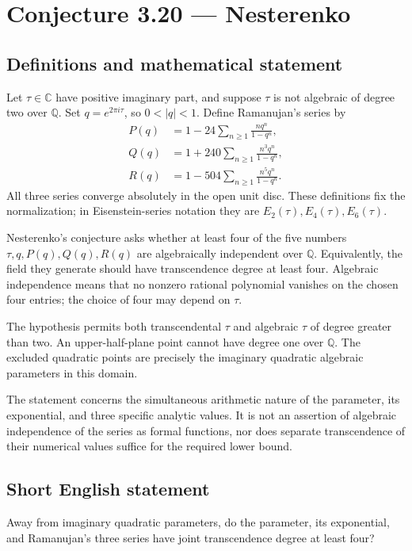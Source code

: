 \documentclass[11pt,a4paper]{article}
\begin{document}
\section*{Conjecture 3.20 — Nesterenko}\label{statement}

\subsection{Definitions and mathematical statement}
Let $\tau\in\mathbb C$ have positive imaginary part, and suppose $\tau$ is not algebraic of degree two over $\mathbb Q$. Set $q=e^{2\pi i\tau}$, so $0<|q|<1$. Define Ramanujan's series by
\[
\begin{aligned}
P(q)&=1-24\sum_{n\ge1}\frac{nq^n}{1-q^n},\\
Q(q)&=1+240\sum_{n\ge1}\frac{n^3q^n}{1-q^n},\\
R(q)&=1-504\sum_{n\ge1}\frac{n^5q^n}{1-q^n}.
\end{aligned}
\]
All three series converge absolutely in the open unit disc. These definitions fix the normalization; in Eisenstein-series notation they are $E_2(\tau),E_4(\tau),E_6(\tau)$.

Nesterenko's conjecture asks whether at least four of the five numbers $\tau,q,P(q),Q(q),R(q)$ are algebraically independent over $\mathbb Q$. Equivalently, the field they generate should have transcendence degree at least four. Algebraic independence means that no nonzero rational polynomial vanishes on the chosen four entries; the choice of four may depend on $\tau$.

The hypothesis permits both transcendental $\tau$ and algebraic $\tau$ of degree greater than two. An upper-half-plane point cannot have degree one over $\mathbb Q$. The excluded quadratic points are precisely the imaginary quadratic algebraic parameters in this domain.

The statement concerns the simultaneous arithmetic nature of the parameter, its exponential, and three specific analytic values. It is not an assertion of algebraic independence of the series as formal functions, nor does separate transcendence of their numerical values suffice for the required lower bound.
\subsection{Short English statement}
Away from imaginary quadratic parameters, do the parameter, its exponential, and Ramanujan’s three series have joint transcendence degree at least four?
\end{document}

